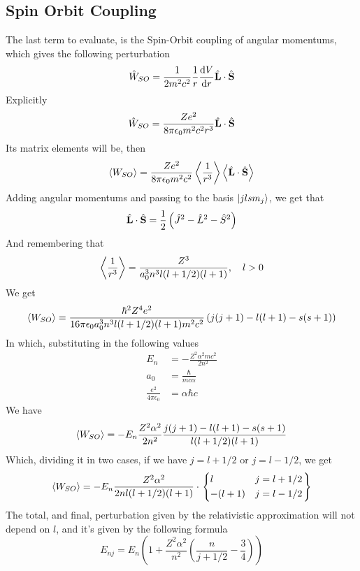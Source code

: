 \documentclass[../qm.tex]{subfiles}
\begin{document}
	\subsection{Spin Orbit Coupling}
	The last term to evaluate, is the Spin-Orbit coupling of angular momentums, which gives the following perturbation
	\begin{equation}
		\opr{W}_{SO}=\frac{1}{2m^2c^2}\frac{1}{r}\derivative{V}{r}\vecopr{L}\cdot\vecopr{S}
		\label{eq:spinorbitpert}
	\end{equation}
	Explicitly
	\begin{equation}
		\hat{W}_{SO}=\frac{Ze^2}{8\pi\epsilon_0m^2c^2r^3}\hat{\mathbf{L}}\cdot\hat{\mathbf{S}}
		\label{eq:spinorbitpertexp}
	\end{equation}
	Its matrix elements will be, then
	\begin{equation}
		\expval{W_{SO}}=\frac{Ze^2}{8\pi\epsilon_0m^2c^2}\expval{\frac{1}{r^3}}\expval{\hat{\mathbf{L}}\cdot\hat{\mathbf{S}}}
		\label{eq:matrixelementssoint}
	\end{equation}
	Adding angular momentums and passing to the basis $\ket{jlsm_j}$, we get that
	\begin{equation*}
		\hat{\mathbf{L}}\cdot\hat{\mathbf{S}}=\frac{1}{2}\left( \hat{J}^2-\hat{L}^2-\hat{S}^2 \right)
	\end{equation*}
	And remembering that
	\begin{equation*}
		\expval{\frac{1}{r^3}}=\frac{Z^3}{a_0^3n^3l(l+1/2)(l+1)},\quad l>0
	\end{equation*}
	We get
	\begin{equation}
		\expval{W_{SO}}=\frac{\hbar^2Z^4e^2}{16\pi\epsilon_0a_0^3n^3l(l+1/2)(l+1)m^2c^2}\left( j(j+1)-l(l+1)-s(s+1) \right)
		\label{eq:wsocomplete}
	\end{equation}
	In which, substituting in the following values
	\begin{equation*}
		\begin{aligned}
			E_n&=-\frac{Z^2\alpha^2mc^2}{2n^2}\\
			a_0&=\frac{\hbar}{mc\alpha}\\
			\frac{e^2}{4\pi\epsilon_0}&=\alpha\hbar c
		\end{aligned}
	\end{equation*}
	We have
	\begin{equation}
		\expval{W_{SO}}=-E_n\frac{Z^2\alpha^2}{2n^2}\frac{j(j+1)-l(l+1)-s(s+1)}{l(l+1/2)(l+1)}
		\label{eq:wsosubstituted}
	\end{equation}
	Which, dividing it in two cases, if we have $j=l+1/2$ or $j=l-1/2$, we get
	\begin{equation}
		\expval{W_{SO}}=-E_n\frac{Z^2\alpha^2}{2nl(l+1/2)(l+1)}\cdot\left.\begin{dcases}l&j=l+1/2\\-(l+1)&j=l-1/2\end{dcases}\right\}
		\label{eq:spinorbitcomplete}
	\end{equation}
	The total, and final, perturbation given by the relativistic approximation will not depend on $l$, and it's given by the following formula
	\begin{equation}
		E_{nj}=E_n\left( 1+\frac{Z^2\alpha^2}{n^2}\left( \frac{n}{j+1/2}-\frac{3}{4} \right) \right)
		\label{eq:finalpertrelcorr}
	\end{equation}
\end{document}
